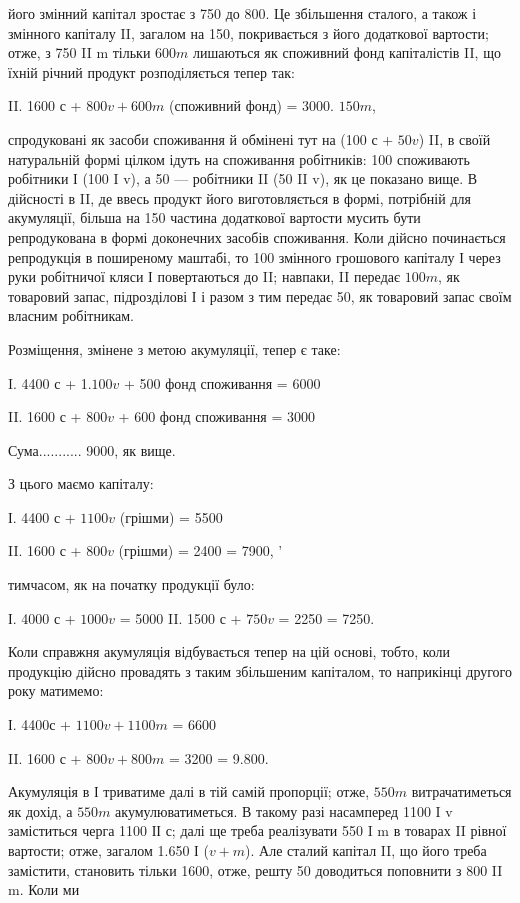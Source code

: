 \parcont{}  %
його змінний капітал зростає з 750 до 800. Це збільшення сталого, а
також і змінного капіталу II, загалом на 150, покривається з його додаткової
вартости; отже, з 750 II m тільки $600 m$ лишаються як споживний
фонд капіталістів II, що їхній річний продукт розподіляється тепер
так:

II. 1600 с + $800 v + 600m$ (споживний фонд) = 3000.    $150 m$,

спродуковані як засоби споживання й обмінені тут на (100 с + $50 v$) II,
в своїй натуральній формі цілком ідуть на споживання робітників: 100
споживають робітники І (100 I v), а 50 — робітники II (50 II v), як це
показано вище. В дійсності в II, де ввесь продукт його виготовляється
в формі, потрібній для акумуляції, більша на 150 частина додаткової
вартости мусить бути репродукована в формі доконечних засобів
споживання. Коли дійсно починається репродукція в поширеному
маштабі, то 100 змінного грошового капіталу І через руки робітничої
кляси І повертаються до II; навпаки, II передає $100 m$, як товаровий
запас, підрозділові І і разом з тим передає 50, як товаровий запас своїм
власним робітникам.

Розміщення, змінене з метою акумуляції, тепер є таке:

I.    4400 с + 1.$100 v$ + 500 фонд споживання = 6000

II.    1600 с + $800 v$ + 600 фонд споживання = 3000

Сума........... 9000, як вище.

З цього маємо капіталу:

І. 4400 с + $1100 v$ (грішми) = 5500

II. 1600 с + $800 v$ (грішми) = 2400
= 7900, ’

тимчасом, як на початку продукції було:

І. 4000 с + $1000 v$ = 5000
II. 1500 с + $750 v$ = 2250
= 7250.

Коли справжня акумуляція відбувається тепер на цій основі, тобто,
коли продукцію дійсно провадять з таким збільшеним капіталом, то
наприкінці другого року матимемо:

І. 4400с + $1100 v + 1100 m$ = 6600

II. 1600 с + $800 v + 800 m$ = 3200
= 9.800.

Акумуляція в І триватиме далі в тій самій пропорції; отже, $550 m$
витрачатиметься як дохід, а $550 m$ акумулюватиметься. В такому разі насамперед
1100 I v заміститься черга 1100 ІІ с; далі ще треба реалізувати
550 I m в товарах II рівної вартости; отже, загалом 1.650 І
($v + m$). Але сталий капітал II, що його треба замістити, становить
тільки 1600, отже, решту 50 доводиться поповнити з 800 II m. Коли ми
\parbreak{}  %
